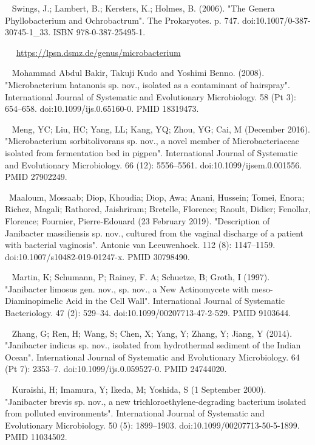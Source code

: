\documentclass[11pt]{article}
\begin{document}
\begin{thebibliography}{3}
	~ Swings, J.; Lambert, B.; Kersters, K.; Holmes, B. (2006). "The Genera Phyllobacterium and Ochrobactrum". The Prokaryotes. p. 747. doi:10.1007/0-387-30745-1\_33. ISBN 978-0-387-25495-1.

	~ ~\url{https://lpsn.dsmz.de/genus/microbacterium}
	
	~  Mohammad Abdul Bakir, Takuji Kudo and Yoshimi Benno. (2008). "Microbacterium hatanonis sp. nov., isolated as a contaminant of hairspray". International Journal of Systematic and Evolutionary Microbiology. 58 (Pt 3): 654–658. doi:10.1099/ijs.0.65160-0. PMID 18319473.
	
	~  Meng, YC; Liu, HC; Yang, LL; Kang, YQ; Zhou, YG; Cai, M (December 2016). "Microbacterium sorbitolivorans sp. nov., a novel member of Microbacteriaceae isolated from fermentation bed in pigpen". International Journal of Systematic and Evolutionary Microbiology. 66 (12): 5556–5561. doi:10.1099/ijsem.0.001556. PMID 27902249.

	~Maaloum, Mossaab; Diop, Khoudia; Diop, Awa; Anani, Hussein; Tomei, Enora; Richez, Magali; Rathored, Jaishriram; Bretelle, Florence; Raoult, Didier; Fenollar, Florence; Fournier, Pierre-Edouard (23 February 2019). "Description of Janibacter massiliensis sp. nov., cultured from the vaginal discharge of a patient with bacterial vaginosis". Antonie van Leeuwenhoek. 112 (8): 1147–1159. doi:10.1007/s10482-019-01247-x. PMID 30798490.
	
	~ Martin, K; Schumann, P; Rainey, F. A; Schuetze, B; Groth, I (1997). "Janibacter limosus gen. nov., sp. nov., a New Actinomycete with meso-Diaminopimelic Acid in the Cell Wall". International Journal of Systematic Bacteriology. 47 (2): 529–34. doi:10.1099/00207713-47-2-529. PMID 9103644.
	
	~ Zhang, G; Ren, H; Wang, S; Chen, X; Yang, Y; Zhang, Y; Jiang, Y (2014). "Janibacter indicus sp. nov., isolated from hydrothermal sediment of the Indian Ocean". International Journal of Systematic and Evolutionary Microbiology. 64 (Pt 7): 2353–7. doi:10.1099/ijs.0.059527-0. PMID 24744020.
	
	~ Kuraishi, H; Imamura, Y; Ikeda, M; Yoshida, S (1 September 2000). "Janibacter brevis sp. nov., a new trichloroethylene-degrading bacterium isolated from polluted environments". International Journal of Systematic and Evolutionary Microbiology. 50 (5): 1899–1903. doi:10.1099/00207713-50-5-1899. PMID 11034502.
	

\end{thebibliography}
\end{document}
